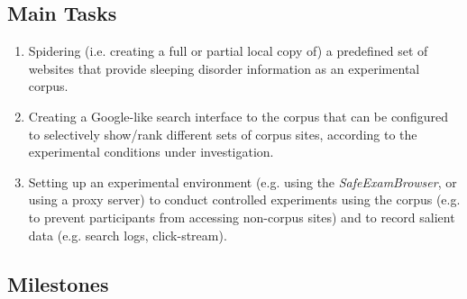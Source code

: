 \documentclass[a4paper]{usiinfbachelorproject}
\begin{document}
\subsection{\textbf{Main Tasks}} \label{sec:reqTasks}

    \begin{enumerate}

        \item Spidering (i.e. creating a full or partial local copy of) a predefined set of websites that provide
              sleeping disorder information as an experimental corpus. 

        \item Creating a Google-like search interface to the corpus that can be configured to selectively show/rank different sets of
              corpus sites, according to the experimental conditions under investigation.

        \item Setting up an experimental environment (e.g. using the \emph{SafeExamBrowser}, or using a proxy server) to
              conduct controlled experiments using the corpus (e.g. to prevent participants from accessing non-corpus sites)
              and to record salient data (e.g. search logs, click-stream).

    \end{enumerate} 

\subsection{\textbf{Milestones}} \label{sec:reqMilestones}
\end{document}

